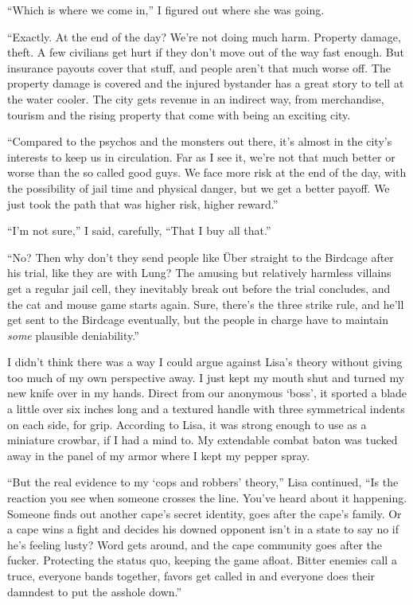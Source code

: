 ``Which is where we come in,'' I figured out where she was going.



``Exactly.  At the end of the day?  We're not doing much harm.  Property damage, theft.  A few civilians get hurt if they don't move out of the way fast enough.  But insurance payouts cover that stuff, and people aren't that much worse off.  The property damage is covered and the injured bystander has a great story to tell at the water cooler.  The city gets revenue in an indirect way, from merchandise, tourism and the rising property that come with being an exciting city.



``Compared to the psychos and the monsters out there, it's almost in the city's interests to keep us in circulation.  Far as I see it, we're not that much better or worse than the so called good guys.  We face more risk at the end of the day, with the possibility of jail time and physical danger, but we get a better payoff.  We just took the path that was higher risk, higher reward.''



``I'm not sure,'' I said, carefully, ``That I buy all that.''



``No? Then why don't they send people like \"{U}ber straight to the Birdcage after his trial, like they are with Lung?  The amusing but relatively harmless villains get a regular jail cell, they inevitably break out before the trial concludes, and the cat and mouse game starts again.  Sure, there's the three strike rule, and he'll get sent to the Birdcage eventually, but the people in charge have to maintain \emph{some} plausible deniability.''



I didn't think there was a way I could argue against Lisa's theory without giving too much of my own perspective away.  I just kept my mouth shut and turned my new knife over in my hands.  Direct from our anonymous `boss', it sported a blade a little over six inches long and a textured handle with three symmetrical indents on each side, for grip.  According to Lisa, it was strong enough to use as a miniature crowbar, if I had a mind to.  My extendable combat baton was tucked away in the panel of my armor where I kept my pepper spray.



``But the real evidence to my `cops and robbers' theory,'' Lisa continued, ``Is the reaction you see when someone crosses the line.  You've heard about it happening.  Someone finds out another cape's secret identity, goes after the cape's family.  Or a cape wins a fight and decides his downed opponent isn't in a state to say no if he's feeling lusty?  Word gets around, and the cape community goes after the fucker.  Protecting the status quo, keeping the game afloat.  Bitter enemies call a truce, everyone bands together, favors get called in and everyone does their damndest to put the asshole down.''



